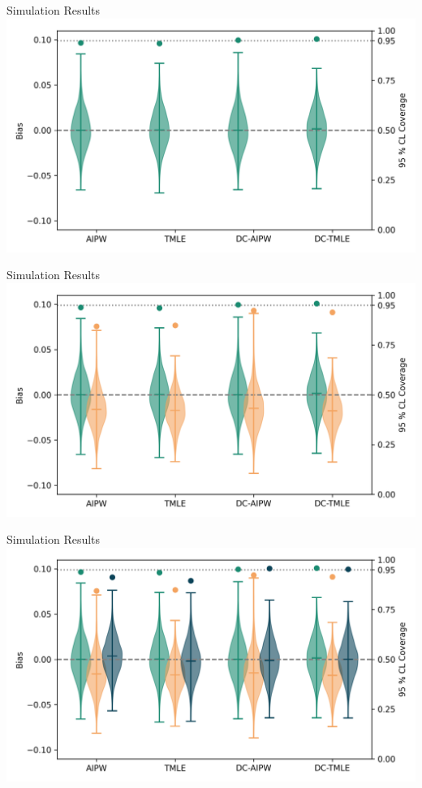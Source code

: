 \documentclass{beamer}
\begin{document}

\begin{frame}{Simulation Results}
	\centering
	\includegraphics[scale=0.62]{images/sim_result1.png}
\end{frame}

\begin{frame}{Simulation Results}
	\centering
	\includegraphics[scale=0.62]{images/sim_result2.png}
\end{frame}

\begin{frame}{Simulation Results}
	\centering
	\includegraphics[scale=0.62]{images/sim_result3.png}
\end{frame}
\end{document}
